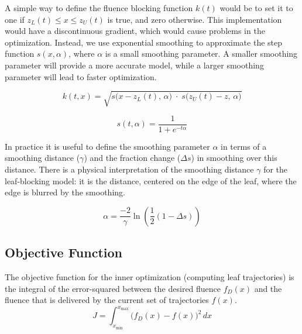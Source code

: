 A simple way to define the fluence blocking function $k(t)$
would be to set it to one if $z_L(t) \leq x \leq z_U(t)$
is true, and zero otherwise.
This implementation would have a discontinuous gradient, which would cause problems in the optimization.
Instead, we use exponential smoothing to approximate the step function $s(x,\alpha)$,
where $\alpha$ is a small smoothing parameter.
A smaller smoothing parameter will provide a more accurate model,
while a larger smoothing parameter will lead to faster optimization.

\begin{equation}
  k(t, x) = \sqrt{s\big(x - z_L(t), \, \alpha\big) \; \cdot \; s\big(z_U(t) - z, \, \alpha\big)}
\end{equation}

\begin{equation}
  s(t, \alpha) = \frac{1}{1 + e^{-t \alpha}}
\end{equation}

In practice it is useful to define the smoothing parameter $\alpha$ in terms of a smoothing distance ($\gamma$)
and the fraction change ($\Delta s$) in smoothing over this distance.
There is a physical interpretation of the smoothing distance $\gamma$ for the leaf-blocking model:
it is the distance, centered on the edge of the leaf, where the edge is blurred by the smoothing.

\begin{equation}
  \alpha = \frac{-2}{\gamma} \ln \left( \frac{1}{2} (1 - \Delta s) \right)
  \label{eqn:SmoothingDistanceParameter}
\end{equation}



\subsection{Objective Function}

The objective function for the inner optimization (computing leaf trajectories)
is the integral of the error-squared between the desired fluence $f_D(x)$ and the fluence that
is delivered by the current set of trajectories $f(x)$.
\begin{equation}
  J = \int_{x_\text{min}}^{x_\text{max}} \! \bigg( f_D(x) - f(x) \bigg)^2 \,dx
  \label{eqn:continuousFittingObjective}
\end{equation}

